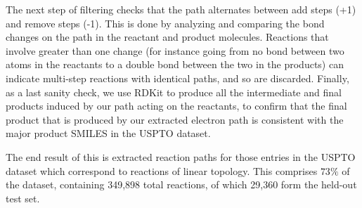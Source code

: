 The next step of filtering checks that the path alternates between add steps (+1) and remove steps (-1). 
This is done by analyzing and comparing the bond changes on the path in the reactant and product molecules. 
Reactions that involve greater than one change (for instance going from no bond between two atoms in the reactants to a double bond between the two in the products) can indicate multi-step 
reactions with identical paths, and so are discarded.
Finally, as a last sanity check, we use RDKit to produce all the intermediate and final products induced by our path acting on the reactants,
to confirm that the final product that is produced by our extracted electron path is consistent with the major product SMILES in the USPTO dataset.

The end result of this is extracted reaction paths for those entries in the USPTO dataset which 
correspond to reactions of linear topology.
This comprises $73\%$ of the dataset, containing 349,898 total reactions, of which 29,360 form the held-out test set.


